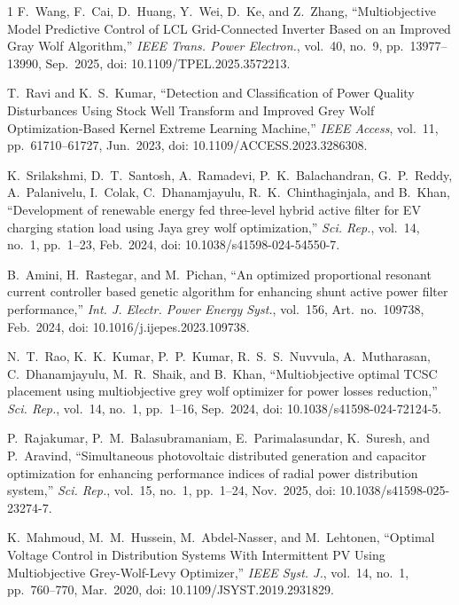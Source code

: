 \begin{thebibliography}{1}
 F.~Wang, F.~Cai, D.~Huang, Y.~Wei, D.~Ke, and Z.~Zhang, ``Multiobjective Model Predictive Control of LCL Grid-Connected Inverter Based on an Improved Gray Wolf Algorithm,'' \textit{IEEE Trans. Power Electron.}, vol.~40, no.~9, pp.~13977--13990, Sep.~2025, doi: 10.1109/TPEL.2025.3572213.

 T.~Ravi and K.~S.~Kumar, ``Detection and Classification of Power Quality Disturbances Using Stock Well Transform and Improved Grey Wolf Optimization-Based Kernel Extreme Learning Machine,'' \textit{IEEE Access}, vol.~11, pp.~61710--61727, Jun.~2023, doi: 10.1109/ACCESS.2023.3286308.

 K.~Srilakshmi, D.~T.~Santosh, A.~Ramadevi, P.~K.~Balachandran, G.~P.~Reddy, A.~Palanivelu, I.~Colak, C.~Dhanamjayulu, R.~K.~Chinthaginjala, and B.~Khan, ``Development of renewable energy fed three-level hybrid active filter for EV charging station load using Jaya grey wolf optimization,'' \textit{Sci. Rep.}, vol.~14, no.~1, pp.~1--23, Feb.~2024, doi: 10.1038/s41598-024-54550-7.

 B.~Amini, H.~Rastegar, and M.~Pichan, ``An optimized proportional resonant current controller based genetic algorithm for enhancing shunt active power filter performance,'' \textit{Int. J. Electr. Power Energy Syst.}, vol.~156, Art.~no.~109738, Feb.~2024, doi: 10.1016/j.ijepes.2023.109738.

 N.~T.~Rao, K.~K.~Kumar, P.~P.~Kumar, R.~S.~S.~Nuvvula, A.~Mutharasan, C.~Dhanamjayulu, M.~R.~Shaik, and B.~Khan, ``Multiobjective optimal TCSC placement using multiobjective grey wolf optimizer for power losses reduction,'' \textit{Sci. Rep.}, vol.~14, no.~1, pp.~1--16, Sep.~2024, doi: 10.1038/s41598-024-72124-5.

 P.~Rajakumar, P.~M.~Balasubramaniam, E.~Parimalasundar, K.~Suresh, and P.~Aravind, ``Simultaneous photovoltaic distributed generation and capacitor optimization for enhancing performance indices of radial power distribution system,'' \textit{Sci. Rep.}, vol.~15, no.~1, pp.~1--24, Nov.~2025, doi: 10.1038/s41598-025-23274-7.

 K.~Mahmoud, M.~M.~Hussein, M.~Abdel-Nasser, and M.~Lehtonen, ``Optimal Voltage Control in Distribution Systems With Intermittent PV Using Multiobjective Grey-Wolf-Levy Optimizer,'' \textit{IEEE Syst. J.}, vol.~14, no.~1, pp.~760--770, Mar.~2020, doi: 10.1109/JSYST.2019.2931829.

\end{thebibliography}
